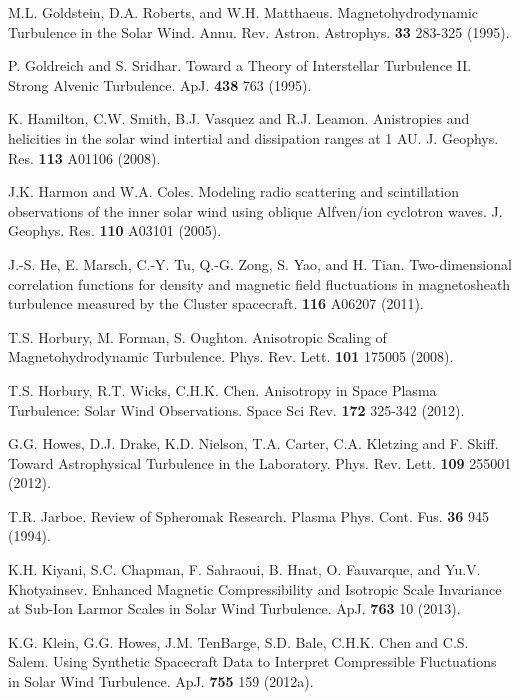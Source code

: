 \documentclass[manuscript]{aastex}
\begin{document}
\begin{thebibliography}{}
 M.L. Goldstein, D.A. Roberts, and W.H. Matthaeus. Magnetohydrodynamic Turbulence in the Solar Wind. Annu. Rev. Astron. Astrophys. {\bf 33} 283-325 (1995).

 P. Goldreich and S. Sridhar. Toward a Theory of Interstellar Turbulence II. Strong Alvenic Turbulence. ApJ. {\bf 438} 763 (1995).

 K. Hamilton, C.W. Smith, B.J. Vasquez and R.J. Leamon. Anistropies and helicities in the solar wind intertial and dissipation ranges at 1 AU. J. Geophys. Res. {\bf 113} A01106 (2008).

 J.K. Harmon and W.A. Coles. Modeling radio scattering and scintillation observations of the inner solar wind using oblique Alfven/ion cyclotron waves. J. Geophys. Res. {\bf 110} A03101 (2005).

 J.-S. He, E. Marsch, C.-Y. Tu, Q.-G. Zong, S. Yao, and H. Tian. Two-dimensional correlation functions for density and magnetic field fluctuations in magnetosheath turbulence measured by the Cluster spacecraft. {\bf 116} A06207 (2011).

 T.S. Horbury, M. Forman, S. Oughton. Anisotropic Scaling of Magnetohydrodynamic Turbulence. Phys. Rev. Lett. {\bf 101} 175005 (2008).

 T.S. Horbury, R.T. Wicks, C.H.K. Chen. Anisotropy in Space Plasma Turbulence: Solar Wind Observations. Space Sci Rev. {\bf 172} 325-342 (2012).

 G.G. Howes, D.J. Drake, K.D. Nielson, T.A. Carter, C.A. Kletzing and F. Skiff. Toward Astrophysical Turbulence in the Laboratory. Phys. Rev. Lett. {\bf 109} 255001 (2012).

T.R. Jarboe. Review of Spheromak Research. Plasma Phys. Cont. Fus. {\bf 36} 945 (1994).

 K.H. Kiyani, S.C. Chapman, F. Sahraoui, B. Hnat, O. Fauvarque, and Yu.V. Khotyainsev. Enhanced Magnetic Compressibility and Isotropic Scale Invariance at Sub-Ion Larmor Scales in Solar Wind Turbulence. ApJ. {\bf 763} 10 (2013).

 K.G. Klein, G.G. Howes, J.M. TenBarge, S.D. Bale, C.H.K. Chen and C.S. Salem. Using Synthetic Spacecraft Data to Interpret Compressible Fluctuations in Solar Wind Turbulence. ApJ. {\bf 755} 159 (2012a).


\end{thebibliography}
\end{document}
